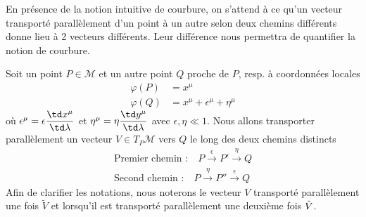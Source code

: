 En présence de la notion intuitive de courbure, on s'attend à ce qu'un vecteur transporté parallèlement d'un point à un autre selon deux chemins différents donne lieu à 2 vecteurs différents. Leur différence nous permettra de quantifier la notion de courbure.  

Soit un point $P \in \mathcal{M}$ et un autre point $Q$ proche de $P$, resp. à coordonnées locales 
\begin{align}
    \varphi(P) &= x^\mu\\
    \varphi(Q) &= x^\mu + \epsilon^\mu + \eta^\mu
\end{align}
où $\epsilon^\mu = \epsilon \dfrac{\td x^\mu}{\td \lambda}$ et $\eta^\mu = \eta \dfrac{\td y^\mu}{\td \lambda}$ avec $\epsilon, \eta \ll 1$. Nous allons transporter parallèlement un vecteur $V \in T_P \mathcal{M}$ vers $Q$ le long des deux chemins distincts
\begin{align*}
    \text{Premier chemin :} \quad P \overset{\epsilon}{\to} P' \overset{\eta}{\to} Q \\
    \text{Second chemin :} \quad P \overset{\eta}{\to} P'' \overset{\epsilon}{\to} Q 
\end{align*}
Afin de clarifier les notations, nous noterons le vecteur $V$ transporté parallèlement une fois $\tilde{V}$ et lorsqu'il est transporté parallèlement une deuxième fois $\Hat{V}$.

